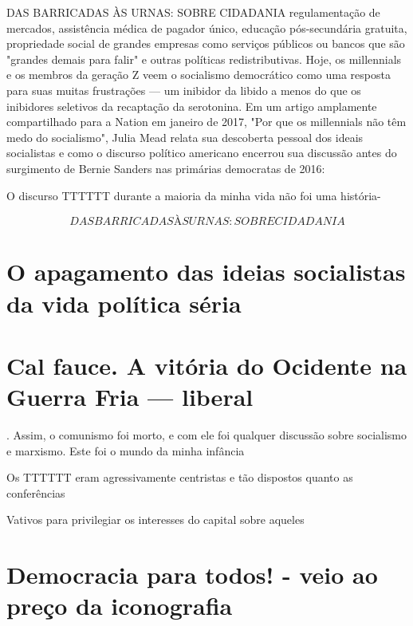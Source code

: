  \par 
DAS BARRICADAS ÀS URNAS: SOBRE CIDADANIA regulamentação de mercados, assistência médica de pagador único, educação pós-secundária gratuita, propriedade social de grandes empresas como serviços públicos ou bancos que são "grandes demais para falir" e outras políticas redistributivas. Hoje, os millennials e os membros da geração Z veem o socialismo democrático como uma resposta para suas muitas frustrações — um inibidor da libido a menos do que os inibidores seletivos da recaptação da serotonina. Em um artigo amplamente compartilhado para a Nation em janeiro de 2017, "Por que os millennials não têm medo do socialismo", Julia Mead relata sua descoberta pessoal dos ideais socialistas e como o discurso político americano encerrou sua discussão antes do surgimento de Bernie Sanders nas primárias democratas de 2016:
 \par 
O discurso TTTTTT durante a maioria da minha vida não foi uma história-
 \par 
\[DAS BARRICADAS ÀS URNAS: SOBRE CIDADANIA\]
 \par 
\section{O apagamento das ideias socialistas da vida política séria}
 \par 
\section{Cal fauce. A vitória do Ocidente na Guerra Fria — liberal}
 \par 
. Assim, o comunismo foi morto, e com ele foi qualquer discussão sobre socialismo e marxismo. Este foi o mundo da minha infância
 \par 
Os TTTTTT eram agressivamente centristas e tão dispostos quanto as conferências
 \par 
Vativos para privilegiar os interesses do capital sobre aqueles
 \par 
\section{Democracia para todos! - veio ao preço da iconografia}
 \par 
